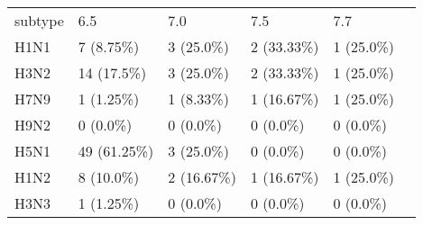 \begin{tabular}{L{.6in}|L{.9in}|L{.9in}|L{.9in}|L{.9in}|L{.9in}}\hline
subtype&6.5&7.0&7.5&7.7\\
H1N1& 7  (8.75\%) & 3  (25.0\%) & 2  (33.33\%) & 1  (25.0\%) \\
H3N2& 14  (17.5\%) & 3  (25.0\%) & 2  (33.33\%) & 1  (25.0\%) \\
H7N9& 1  (1.25\%) & 1  (8.33\%) & 1  (16.67\%) & 1  (25.0\%) \\
H9N2& 0  (0.0\%) & 0  (0.0\%) & 0  (0.0\%) & 0  (0.0\%) \\
H5N1& 49  (61.25\%) & 3  (25.0\%) & 0  (0.0\%) & 0  (0.0\%) \\
H1N2& 8  (10.0\%) & 2  (16.67\%) & 1  (16.67\%) & 1  (25.0\%) \\
H3N3& 1  (1.25\%) & 0  (0.0\%) & 0  (0.0\%) & 0  (0.0\%) \\
\hline\end{tabular}
